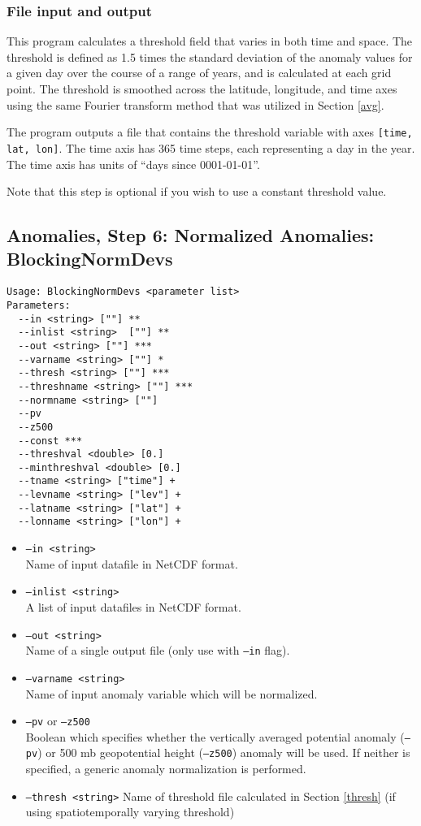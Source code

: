 \documentclass{article}
\begin{document}
\subsubsection{File input and output}
This program calculates a threshold field that varies in both time and space. The threshold is defined as 1.5 times the standard deviation of the anomaly values for a given day over the course of a range of years, and is calculated at each grid point. The threshold is smoothed across the latitude, longitude, and time axes using the same Fourier transform method that was utilized in Section \ref{avg}.

The program outputs a file that contains the threshold variable with axes \texttt{[time, lat, lon]}. The time axis has 365 time steps, each representing a day in the year. The time axis has units of ``days since 0001-01-01''.

Note that this step is optional if you wish to use a constant threshold value.

\subsection{Anomalies, Step 6: Normalized Anomalies: BlockingNormDevs}\label{ndev}
\begin{verbatim}
Usage: BlockingNormDevs <parameter list>
Parameters:
  --in <string> [""] **
  --inlist <string>  [""] **
  --out <string> [""] ***
  --varname <string> [""] *
  --thresh <string> [""] ***
  --threshname <string> [""] ***
  --normname <string> [""]
  --pv
  --z500
  --const ***
  --threshval <double> [0.]
  --minthreshval <double> [0.]
  --tname <string> ["time"] +
  --levname <string> ["lev"] +
  --latname <string> ["lat"] +
  --lonname <string> ["lon"] +
\end{verbatim}

\begin{itemize}
\item[]\texttt{--in <string>}\\ Name of input datafile in NetCDF format.
\item[]\texttt{--inlist <string>} \\ A list of input datafiles in NetCDF format. 
\item[] \texttt{--out <string>} \\ Name of a single output file (only use with \texttt{--in} flag).
\item[] \texttt{--varname <string>}\\Name of input anomaly variable which will be normalized.
\item[]\texttt{--pv} or \texttt{--z500}\\Boolean which specifies whether the vertically averaged potential anomaly (\texttt{--pv}) or 500 mb geopotential height (\texttt{--z500}) anomaly will be used. If neither is specified, a generic anomaly normalization is performed.
\item[]\texttt{--thresh <string>} Name of threshold file calculated in Section \ref{thresh} (if using spatiotemporally varying threshold)
\end{itemize}
\end{document}
